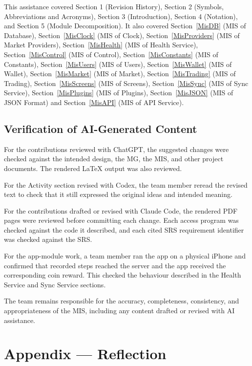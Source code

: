 \documentclass[12pt, titlepage]{article}
\begin{document}
\medskip\noindent
This assistance covered Section 1 (Revision History), Section 2 (Symbols, Abbreviations and Acronyms), Section 3 (Introduction), Section 4 (Notation), and Section 5 (Module Decomposition). It also covered Section~\ref{MisDB} (MIS of Database), Section~\ref{MisClock} (MIS of Clock), Section~\ref{MisProviders} (MIS of Market Providers), Section~\ref{MisHealth} (MIS of Health Service), Section~\ref{MisControl} (MIS of Control), Section~\ref{MisConstants} (MIS of Constants), Section~\ref{MisUsers} (MIS of Users), Section~\ref{MisWallet} (MIS of Wallet), Section~\ref{MisMarket} (MIS of Market), Section~\ref{MisTrading} (MIS of Trading), Section~\ref{MisScreens} (MIS of Screens), Section~\ref{MisSync} (MIS of Sync Service), Section~\ref{MisPlugins} (MIS of Plugins), Section~\ref{MisJSON} (MIS of JSON Format) and Section~\ref{MisAPI} (MIS of API Service).

\subsection{Verification of AI-Generated Content}
For the contributions reviewed with ChatGPT, the suggested changes were checked against the intended design, the MG, the MIS, and other project documents. The rendered LaTeX output was also reviewed. 

\medskip\noindent
For the Activity section revised with Codex, the team member reread the revised text to check that it still expressed the original ideas and intended meaning. 

\medskip\noindent
For the contributions drafted or revised with Claude Code, the rendered PDF pages were reviewed before committing each change. Each access program was checked against the code it described, and each cited SRS requirement identifier was checked against the SRS. 

\medskip\noindent
For the app-module work, a team member ran the app on a physical iPhone and confirmed that recorded steps reached the server and the app received the corresponding coin reward. This checked the behaviour described in the Health Service and Sync Service sections.

\medskip\noindent
The team remains responsible for the accuracy, completeness, consistency, and appropriateness of the MIS, including any content drafted or revised with AI assistance.


\newpage{}

\section{Appendix --- Reflection}
\end{document}
